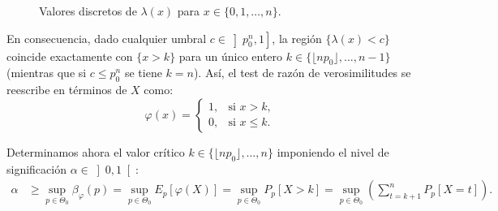 \begin{ejercicio}
\begin{figure}[ht]
        \caption{Valores discretos de $\lambda(x)$ para $x \in \{0, 1, \ldots, n\}$.}
        \label{fig:razon_verosimilitudes_binomial}
    \end{figure}

    En consecuencia, dado cualquier umbral $c \in \left]p_0^n, 1\right]$, la región $\{\lambda(x) < c\}$ coincide exactamente con $\{x > k\}$ para un único entero $k \in \{\lfloor np_0 \rfloor, \ldots, n - 1\}$ (mientras que si $c \leq p_0^n$ se tiene $k = n$). Así, el test de razón de verosimilitudes se reescribe en términos de $X$ como:
    \begin{equation*}
        \varphi(x) =
        \begin{cases}
            1, & \text{si } x > k, \\
            0, & \text{si } x \leq k.
        \end{cases}
    \end{equation*}

    Determinamos ahora el valor crítico $k \in \{\lfloor np_0 \rfloor, \ldots, n\}$ imponiendo el nivel de significación $\alpha \in \left]0, 1\right[$:
    \begin{align*}
        \alpha &\geq \sup_{p \in \Theta_0} \beta_\varphi(p) = \sup_{p \in \Theta_0} E_p[\varphi(X)] = \sup_{p \in \Theta_0} P_p[X > k] = \sup_{p \in \Theta_0} \left(\sum_{t = k + 1}^{n} P_p[X = t]\right).
    \end{align*}


\end{ejercicio}
